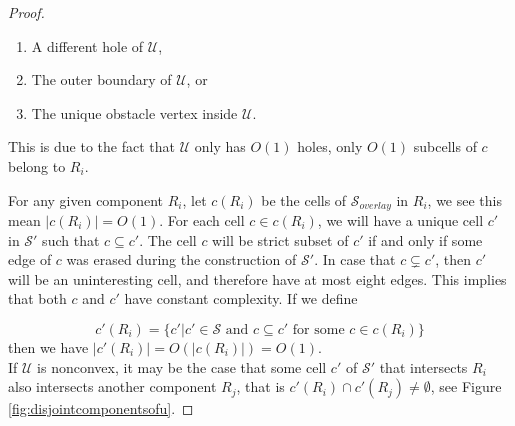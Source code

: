 \begin{proof}
\begin{enumerate}
\item A different hole of $\mathcal{U}$,
\item The outer boundary of $\mathcal{U}$, or
\item The unique obstacle vertex inside $\mathcal{U}$.
\end{enumerate}

This is due to the fact that $\mathcal{U}$ only has $O(1)$ holes, only $O(1)$ subcells 
of $c$ belong to $R_i$. 

For any given component $R_i$, let $c(R_i)$ be the cells of $\mathcal{S}_{overlay}$ in $R_i$, 
we see this mean $|c(R_i)| = O(1)$. For each cell $c\in c(R_i)$, we will have a unique cell $c'$ 
in $\mathcal{S}'$ such that $c \subseteq c'$. The cell $c$ will be strict subset of $c'$ if 
and only if some edge of $c$ was erased during the construction of $\mathcal{S}'$. 
In case that $c \subsetneq c'$, then $c'$ will be an uninteresting cell, and therefore have at 
most eight edges. This implies that both $c$ and $c'$ have constant complexity. 
If we define

$$c'(R_i)=\{c'|c'\in\mathcal{S} \text{ and } c \subseteq c' \text{ for some } c\in c(R_i)\}$$
then we have $|c'(R_i)| = O(|c(R_i)|) = O(1)$. \\

If $\mathcal{U}$ is nonconvex, it may be the case that some cell $c'$ of $\mathcal{S}'$ that 
intersects $R_i$ also intersects another component $R_j$, that is $c'(R_i)\cap c'(R_j) \neq 
\emptyset$, see Figure \ref{fig:disjointcomponentsofu}.


\end{proof}
